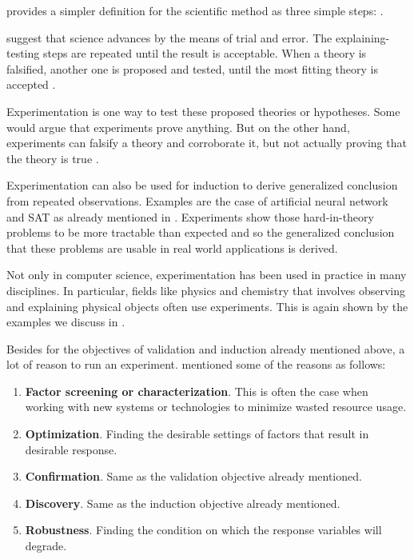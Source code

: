 \citet{careyBeginnerGuideScientific2012} provides a simpler definition for the scientific method as three simple steps:
.


 suggest that science advances by the means of trial and error.
The explaining-testing steps are repeated until the result is acceptable.
When a theory is falsified, another one is proposed and tested, until the most fitting theory is accepted \citep{wallimanResearchMethodsBasics2010a}.

Experimentation is one way to test these proposed theories or hypotheses.
Some would argue that experiments  prove anything.
But on the other hand, experiments can falsify a theory and corroborate it, but not actually proving that the theory is true \citep{tichyShouldComputerScientists1998}.

Experimentation can also be used for induction to derive generalized conclusion from repeated observations.
Examples are the case of artificial neural network and SAT as already mentioned in .
Experiments show those hard-in-theory problems to be more tractable than expected and so the generalized conclusion that these problems are usable in real world applications is derived.

Not only in computer science, experimentation has been used in practice in many disciplines.
In particular, fields like physics and chemistry that involves observing and explaining physical objects often use experiments.
This is again shown by the examples we discuss in .

Besides for the objectives of validation and induction already mentioned above,  a lot of reason to run an experiment.
\citet{montgomeryDesignAnalysisExperiments2013} mentioned some of the reasons as follows:
\begin {enumerate}[noitemsep]
	\item \textbf{Factor screening or characterization}. This is often the case when working with new systems or technologies to minimize wasted resource usage.
	\item \textbf{Optimization}. Finding the desirable settings of factors that result in desirable response.
	\item \textbf{Confirmation}. Same as the validation objective already mentioned.
	\item \textbf{Discovery}. Same as the induction objective already mentioned.
	\item \textbf{Robustness}. Finding the condition on which the response variables will degrade.
\end{enumerate}

